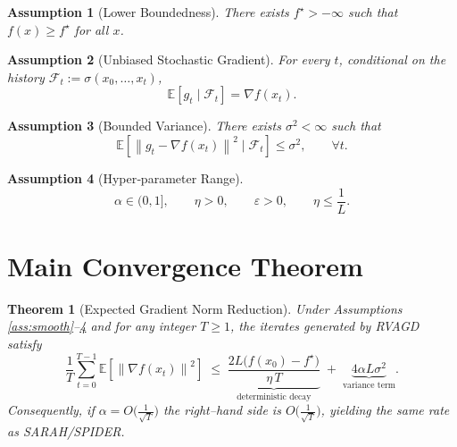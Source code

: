 \documentclass[11pt]{article}
\newtheorem{theorem}{Theorem}
\newtheorem{assumption}{Assumption}
\newcommand{\EE}{\mathbb{E}}
\newcommand{\norm}[1]{\left\|#1\right\|}
\newcommand{\grad}{\nabla}
\begin{document}
\begin{assumption}[Lower Boundedness]\label{ass:lb}
There exists $f^{\star}>-\infty$ such that $f(x)\ge f^{\star}$ for all $x$.
\end{assumption}

\begin{assumption}[Unbiased Stochastic Gradient]\label{ass:unbiased}
For every $t$, conditional on the history $\mathcal{F}_{t}:=\sigma(x_{0},\dots,x_{t})$,
\[
\EE\!\left[g_{t}\mid\mathcal{F}_{t}\right]=\grad f(x_{t}).
\tag{A3}
\]
\end{assumption}

\begin{assumption}[Bounded Variance]\label{ass:var}
There exists $\sigma^{2}<\infty$ such that
\[
\EE\!\left[\norm{g_{t}-\grad f(x_{t})}^{2}\mid\mathcal{F}_{t}\right]\le\sigma^{2},
\qquad\forall t .
\tag{A4}
\]
\end{assumption}

\begin{assumption}[Hyper‑parameter Range]\label{ass:hyper}
\[
\alpha\in(0,1],\qquad 
\eta>0,\qquad 
\varepsilon>0,\qquad 
\eta\le\frac{1}{L}.
\tag{A5}
\]
\end{assumption}

\section*{Main Convergence Theorem}
\begin{theorem}[Expected Gradient Norm Reduction]\label{thm:main}
Under Assumptions \ref{ass:smooth}–\ref{ass:hyper} and for any integer $T\ge 1$,
the iterates generated by RVAGD satisfy
\[
\frac{1}{T}\sum_{t=0}^{T-1}
\EE\!\left[\norm{\grad f(x_{t})}^{2}\right]
\;\le\;
\underbrace{\frac{2L\bigl(f(x_{0})-f^{\star}\bigr)}{\eta\,T}}_{\displaystyle\text{deterministic decay}}
\;+\;
\underbrace{4\alpha L\sigma^{2}}_{\displaystyle\text{variance term}} .
\tag{5}
\]
Consequently, if $\alpha=O\!\bigl(\tfrac{1}{\sqrt{T}}\bigr)$ the right–hand side is
$O\!\bigl(\tfrac{1}{\sqrt{T}}\bigr)$, yielding the same rate as SARAH/SPIDER.
\end{theorem}
\end{document}
